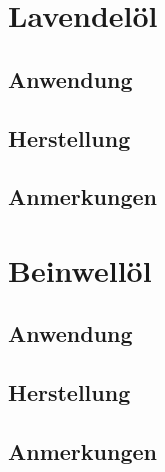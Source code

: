 \section{Lavendelöl}

\subsection{Anwendung}

\subsection{Herstellung}

\subsection{Anmerkungen}








\section{Beinwellöl}

\subsection{Anwendung}

\subsection{Herstellung}

\subsection{Anmerkungen}



